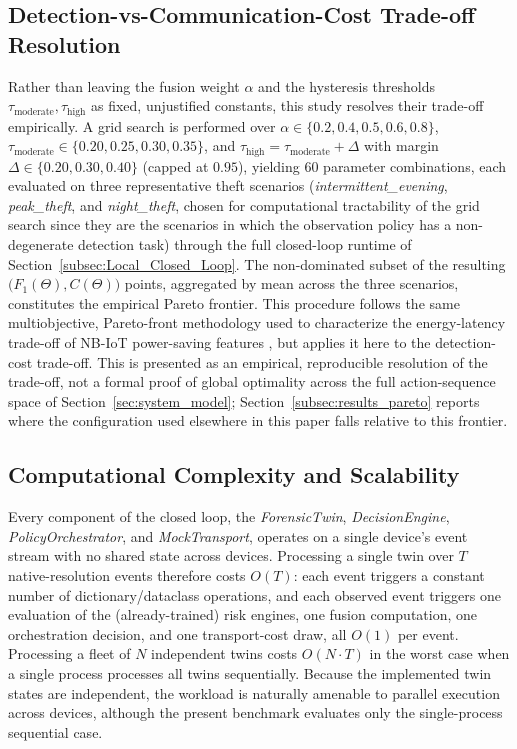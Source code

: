 \documentclass{ieeeaccess}
\begin{document}
\subsection{Detection-vs-Communication-Cost Trade-off Resolution}
\label{subsec:tradeoff_resolution}
Rather than leaving the fusion weight $\alpha$ and the hysteresis thresholds $\tau_{\text{moderate}}, \tau_{\text{high}}$ as fixed, unjustified constants, this study resolves their trade-off empirically. A grid search is performed over $\alpha \in \{0.2, 0.4, 0.5, 0.6, 0.8\}$, $\tau_{\text{moderate}} \in \{0.20, 0.25, 0.30, 0.35\}$, and $\tau_{\text{high}} = \tau_{\text{moderate}} + \Delta$ with margin $\Delta \in \{0.20, 0.30, 0.40\}$ (capped at $0.95$), yielding 60 parameter combinations, each evaluated on three representative theft scenarios (\textit{intermittent\_evening}, \textit{peak\_theft}, and \textit{night\_theft}, chosen for computational tractability of the grid search since they are the scenarios in which the observation policy has a non-degenerate detection task) through the full closed-loop runtime of Section~\ref{subsec:Local_Closed_Loop}. The non-dominated subset of the resulting $\bigl(F_1(\Theta), C(\Theta)\bigr)$ points, aggregated by mean across the three scenarios, constitutes the empirical Pareto frontier. This procedure follows the same multiobjective, Pareto-front methodology used to characterize the energy-latency trade-off of NB-IoT power-saving features \cite{b35}, but applies it here to the detection-cost trade-off. This is presented as an empirical, reproducible resolution of the trade-off, not a formal proof of global optimality across the full action-sequence space of Section~\ref{sec:system_model}; Section~\ref{subsec:results_pareto} reports where the configuration used elsewhere in this paper falls relative to this frontier.

\subsection{Computational Complexity and Scalability}
\label{subsec:complexity}
Every component of the closed loop, the \textit{ForensicTwin}, \textit{DecisionEngine}, \textit{PolicyOrchestrator}, and \textit{MockTransport}, operates on a single device's event stream with no shared state across devices. Processing a single twin over $T$ native-resolution events therefore costs $O(T)$: each event triggers a constant number of dictionary/dataclass operations, and each observed event triggers one evaluation of the (already-trained) risk engines, one fusion computation, one orchestration decision, and one transport-cost draw, all $O(1)$ per event. Processing a fleet of $N$ independent twins costs $O(N\cdot T)$ in the worst case when a single process processes all twins sequentially. Because the implemented twin states are independent, the workload is naturally amenable to parallel execution across devices, although the present benchmark evaluates only the single-process sequential case.
\end{document}
